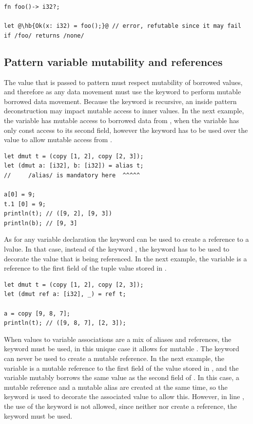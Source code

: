 \begin{lstlisting}[style=coloredverbatim, escapechar=@]
fn foo()-> i32?;

let @\hb{Ok(x: i32) = foo();}@ // error, refutable since it may fail if /foo/ returns /none/
\end{lstlisting}

\subsection{Pattern variable mutability and references}

The value that is passed to pattern must respect mutability of borrowed values,
and therefore as any data movement must use the keyword  to
perform mutable borrowed data movement. Because the keyword is recursive, an
inside pattern deconstruction may impact mutable access to inner values. In the
next example, the variable  has mutable access to borrowed data from
, when the variable  has only const access to its second
field, however the keyword  has to be used over the value
 to allow mutable access from .

\begin{lstlisting}[style=coloredverbatim, escapechar=@]
let dmut t = (copy [1, 2], copy [2, 3]);
let (dmut a: [i32], b: [i32]) = alias t;
//     /alias/ is mandatory here  ^^^^^

a[0] = 9;
t.1 [0] = 9;
println(t); // ([9, 2], [9, 3])
println(b); // [9, 3]
\end{lstlisting}

As for any variable declaration the keyword  can be used to create a
reference to a lvalue. In that case, instead of the keyword \token{alias}, the
keyword \token{ref} has to be used to decorate the value that is being
referenced. In the next example, the variable \token{a} is a reference to the
first field of the tuple value stored in \token{t}.

\begin{lstlisting}[style=coloredverbatim, escapechar=@]
let dmut t = (copy [1, 2], copy [2, 3]);
let (dmut ref a: [i32], _) = ref t;

a = copy [9, 8, 7];
println(t); // ([9, 8, 7], [2, 3]);
\end{lstlisting}

When values to variable associations are a mix of aliases and references, the
keyword \token{ref} must be used, in this unique case it allows for mutable
. The \token{alias} keyword can never be used to create a mutable
reference. In the next example, the variable \token{a} is a mutable reference
to the first field of the value stored in , and the variable
\token{b} mutably borrows the same value as the second field of \token{t}. In
this case, a mutable reference and a mutable alias are created at the same time,
so the keyword  is used to decorate the associated value to allow
this. However, in line \token{4}, the use of the keyword \token{ref} is not
allowed, since neither \token{c} nor \token{d} create a reference, the keyword
\token{alias} must be used.

